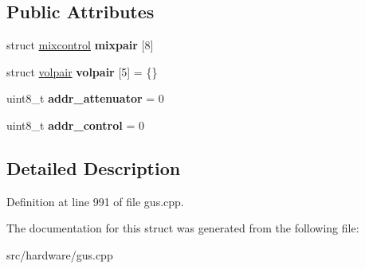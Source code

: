 \subsection*{Public Attributes}
\begin{DoxyCompactItemize}
\item 
\hypertarget{structgus__ICS2101_a7e5b7610442c6f3de38ae67487d9ccfa}{struct \hyperlink{structgus__ICS2101_1_1mixcontrol}{mixcontrol} {\bfseries mixpair} \mbox{[}8\mbox{]}}\label{structgus__ICS2101_a7e5b7610442c6f3de38ae67487d9ccfa}

\item 
\hypertarget{structgus__ICS2101_af99b01cfc9793b759b5c309fd605b563}{struct \hyperlink{structgus__ICS2101_1_1volpair}{volpair} {\bfseries volpair} \mbox{[}5\mbox{]} = \{\}}\label{structgus__ICS2101_af99b01cfc9793b759b5c309fd605b563}

\item 
\hypertarget{structgus__ICS2101_a259bb6122df1b8689fdf2c5445f23623}{uint8\-\_\-t {\bfseries addr\-\_\-attenuator} = 0}\label{structgus__ICS2101_a259bb6122df1b8689fdf2c5445f23623}

\item 
\hypertarget{structgus__ICS2101_ab1b4294e06737b43bd2fba7eeaee46ee}{uint8\-\_\-t {\bfseries addr\-\_\-control} = 0}\label{structgus__ICS2101_ab1b4294e06737b43bd2fba7eeaee46ee}

\end{DoxyCompactItemize}


\subsection{Detailed Description}


Definition at line 991 of file gus.\-cpp.



The documentation for this struct was generated from the following file\-:\begin{DoxyCompactItemize}
\item 
src/hardware/gus.\-cpp\end{DoxyCompactItemize}
